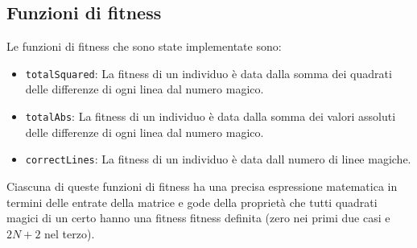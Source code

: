 \documentclass[italian,twoside,twocolumn]{article}
\begin{document}
\subsection{Funzioni di fitness}
Le funzioni di fitness che sono state implementate sono: 
\begin{itemize}
	\item \texttt{totalSquared}: La fitness di un individuo è data dalla somma dei quadrati delle differenze di ogni linea dal numero magico.
	\item \texttt{totalAbs}: La fitness di un individuo è data dalla somma dei valori assoluti delle differenze di ogni linea dal numero magico.
	\item \texttt{correctLines}: La fitness di un individuo è data dall numero di linee magiche. 
\end{itemize}
Ciascuna di queste funzioni di fitness ha una precisa espressione matematica in termini delle entrate della matrice e gode della proprietà che tutti quadrati magici di un certo hanno una fitness fitness definita (zero nei primi due casi e $ 2N + 2 $ nel terzo). 
\end{document}
